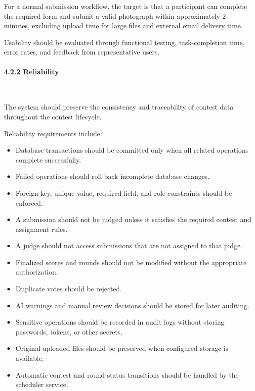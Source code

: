 For a normal submission workflow, the target is that a participant can complete the required form and submit a valid photograph within approximately 2 minutes, excluding upload time for large files and external email delivery time.

Usability should be evaluated through functional testing, task-completion time, error rates, and feedback from representative users.

\paragraph*{4.2.2 Reliability}\leavevmode\\[-0.5em]
\label{par:reliability}

The system should preserve the consistency and traceability of contest data throughout the contest lifecycle.

Reliability requirements include:

\begin{itemize}[leftmargin=1.5em, nosep]
    \item Database transactions should be committed only when all related operations complete successfully.
    \item Failed operations should roll back incomplete database changes.
    \item Foreign-key, unique-value, required-field, and role constraints should be enforced.
    \item A submission should not be judged unless it satisfies the required contest and assignment rules.
    \item A judge should not access submissions that are not assigned to that judge.
    \item Finalized scores and rounds should not be modified without the appropriate authorization.
    \item Duplicate votes should be rejected.
    \item AI warnings and manual review decisions should be stored for later auditing.
    \item Sensitive operations should be recorded in audit logs without storing passwords, tokens, or other secrets.
    \item Original uploaded files should be preserved when configured storage is available.
    \item Automatic contest and round status transitions should be handled by the scheduler service.
\end{itemize}

